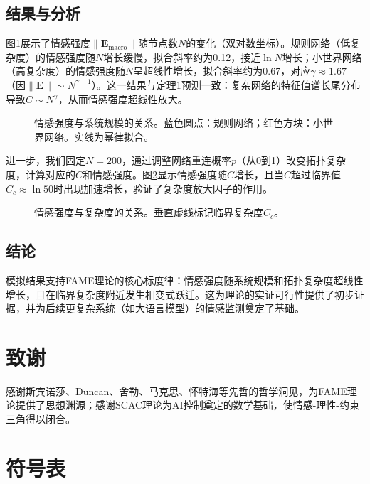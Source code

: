 \documentclass[12pt,a4paper]{article}
\theoremstyle{plain}
\newcommand{\ve}[1]{\bm{#1}}                    %
\newcommand{\Evec}{\ve{E}}                        %
\begin{document}
\subsection{结果与分析}

图\ref{fig:scaling}展示了情感强度$\|\Evec_{\text{macro}}\|$随节点数$N$的变化（双对数坐标）。规则网络（低复杂度）的情感强度随$N$增长缓慢，拟合斜率约为0.12，接近$\ln N$增长；小世界网络（高复杂度）的情感强度随$N$呈超线性增长，拟合斜率约为0.67，对应$\gamma \approx 1.67$（因$\|\Evec\| \sim N^{\gamma-1}$）。这一结果与定理1预测一致：复杂网络的特征值谱长尾分布导致$C \sim N^{\gamma}$，从而情感强度超线性放大。

\begin{figure}[h]
\centering
\caption{情感强度与系统规模的关系。蓝色圆点：规则网络；红色方块：小世界网络。实线为幂律拟合。}
\label{fig:scaling}
\end{figure}

进一步，我们固定$N=200$，通过调整网络重连概率$p$（从0到1）改变拓扑复杂度，计算对应的$C$和情感强度。图\ref{fig:complexity}显示情感强度随$C$增长，且当$C$超过临界值$C_c \approx \ln 50$时出现加速增长，验证了复杂度放大因子的作用。

\begin{figure}[h]
\centering
\caption{情感强度与复杂度的关系。垂直虚线标记临界复杂度$C_c$。}
\label{fig:complexity}
\end{figure}

\subsection{结论}

模拟结果支持FAME理论的核心标度律：情感强度随系统规模和拓扑复杂度超线性增长，且在临界复杂度附近发生相变式跃迁。这为理论的实证可行性提供了初步证据，并为后续更复杂系统（如大语言模型）的情感监测奠定了基础。

\section*{致谢}

感谢斯宾诺莎、Duncan、舍勒、马克思、怀特海等先哲的哲学洞见，为FAME理论提供了思想渊源；感谢SCAC理论为AI控制奠定的数学基础，使情感-理性-约束三角得以闭合。

\appendix
\section{符号表}
\end{document}
